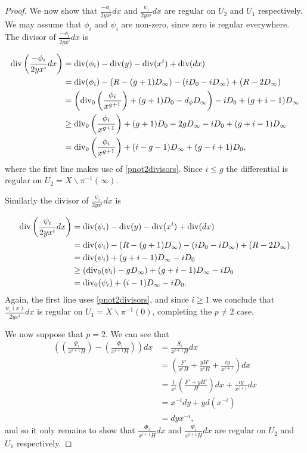\begin{proof}
We now show that $\frac{-\phi_i}{2yx^i}dx$ and $\frac{\psi_i}{2yx^i}dx$ are regular on $U_2$ and $U_1$ respectively.
We may assume that $\phi_i$ and $\psi_i$ are non-zero, since zero is regular everywhere.
The divisor of $\frac{-\phi_i}{2yx^i}dx$ is

\begin{align*}
\operatorname{div}\left( \frac{-\phi_i}{2yx^i}dx \right) & =  \operatorname{div}(\phi_i) -\operatorname{div}(y) - \operatorname{div}(x^i) + \operatorname{div} (dx) \\
& =  \operatorname{div}(\phi_i) - ( R - (g+1)D_\infty) - (iD_0 - iD_\infty) + (R - 2D_\infty) \\
& =  \left( \operatorname{div}_0\left( \frac{\phi_i}{x^{g+1}}\right) + (g+1)D_0 - d_\phi D_\infty\right) - iD_0 + (g+i-1)D_\infty \\
& \geq  \operatorname{div}_0\left( \frac{\phi_i}{x^{g+1}}\right) + (g+1)D_0 - 2gD_\infty - iD_0 + (g+i-1)D_\infty \\
& =  \operatorname{div}_0\left( \frac{\phi_i}{x^{g+1}} \right) + (i-g-1)D_\infty + (g-i+1)D_0,
\end{align*}
where the first line makes use of \eqref{pnot2divisors}.
Since $i \leq g$ the differential is regular on $U_2 = X\backslash \pi^{-1}(\infty)$.

Similarly the divisor of $\frac{\psi_i}{2yx^i}dx$ is

\begin{align*}
\operatorname{div} \left( \frac{\psi_i}{2yx^i}dx\right) & =  \operatorname{div}(\psi_i) - \operatorname{div}(y) - \operatorname{div}(x^i) + \operatorname{div} (dx) \\
& =  \operatorname{div} (\psi_i ) -(R - (g+1)D_\infty) - (iD_0 - iD_\infty) + (R -2D_\infty) \\
& =  \operatorname{div}(\psi_i) + (g+i-1)D_\infty -iD_0 \\
& \geq \left( \operatorname{div}_0(\psi_i) - gD_\infty \right) + (g+i-1)D_\infty -iD_0 \\
& =  \operatorname{div}_0(\psi_i) + (i-1)D_\infty - iD_0.
\end{align*}
Again, the first line uses \eqref{pnot2divisors}, and since $i\geq 1$ we conclude that $\frac{\psi_i(x)}{2yx^i}dx$ is regular on $U_1 = X \backslash \pi^{-1}(0)$, completing the $p\neq 2$ case.


We now suppose that $p=2$.
We can see that
\begin{align*}
\left( \left( \frac{ \Psi_i}{x^{i+1}H} \right) - \left( \frac{\Phi_i}{x^{i+1}H} \right) \right) dx & =  \frac{S_i}{x^{i+1}H}dx \\
& =  \left( \frac{F'}{x^iH} + \frac{yH'}{x^iH} + \frac{iy}{x^{i+1}} \right) dx \\
& =  \frac{1}{x^i}\left( \frac{F' + yH'}{H} \right) dx + \frac{iy}{x^{i+1}}dx \\
& =  x^{-i}dy + yd \left( x^{-i}\right) \\
& =  dyx^{-i},
\end{align*}
and so it only remains to show that $\frac{\Phi_i}{x^{i+1}H}dx$ and $\frac{\Psi_i}{x^{i+1}H}dx$ are regular on $U_2$ and $U_1$ respectively.



\end{proof}
